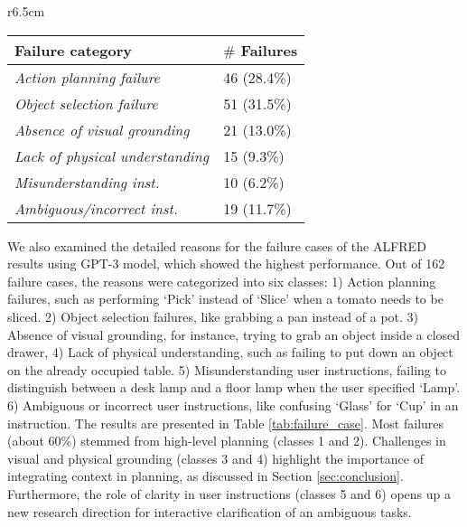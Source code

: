 \begin{wraptable}[11]{r}{6.5cm}
  \centering
  \vspace{-4mm}
  \begin{tabular}{@{}p{4.4cm}p{1.6cm}@{}}
    \toprule
    Failure category	            & $\#$ Failures \\
    \midrule
        \textit{Action planning failure}          & 46 (28.4\%)	\\
        \textit{Object selection failure}	     & 51 (31.5\%)   \\
        \textit{Absence of visual grounding}	     & 21 (13.0\%)	\\
        \textit{Lack of physical understanding}   & 15 (9.3\%)\\
        \textit{Misunderstanding inst.}    & 10 (6.2\%)\\
        \textit{Ambiguous/incorrect inst.} & 19 (11.7\%)\\
    \bottomrule
  \end{tabular}
  \vspace{-2mm}
  \caption{The number of failure cases of the ALFRED results using GPT-3.}
  \label{tab:failure_case}
\end{wraptable}

We also examined the detailed reasons for the failure cases of the ALFRED results using GPT-3 model, which showed the highest performance. Out of 162 failure cases, the reasons were categorized into six classes: 1) Action planning failures, such as performing `Pick' instead of `Slice' when a tomato needs to be sliced. 2) Object selection failures, like grabbing a pan instead of a pot. 3) Absence of visual grounding, for instance, trying to grab an object inside a closed drawer, 4) Lack of physical understanding, such as failing to put down an object on the already occupied table. 5) Misunderstanding user instructions, failing to distinguish between a desk lamp and a floor lamp when the user specified `Lamp'. 6) Ambiguous or incorrect user instructions, like confusing `Glass' for `Cup' in an instruction. The results are presented in Table \ref{tab:failure_case}. Most failures (about 60\%) stemmed from high-level planning (classes 1 and 2). Challenges in visual and physical grounding (classes 3 and 4) highlight the importance of integrating context in planning, as discussed in Section \ref{sec:conclusion}. Furthermore, the role of clarity in user instructions (classes 5 and 6) opens up a new research direction for interactive clarification of an ambiguous tasks.

